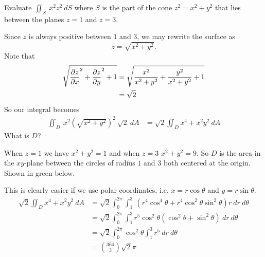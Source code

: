 \documentclass[12pt]{exam}
\begin{document}
\begin{questions}

\question Evaluate \(\iint_S~x^2z^2~dS\) where \(S\) is the part of the cone 
\(z^2=x^2+y^2\) that lies between the planes \(z=1\) and \(z=3\).
\ifprintanswers
        \begin{solution}
            Since \(z\) is always positive between \(1\) and \(3\), we may rewrite the surface as 
            \[
                z=\sqrt{x^2+y^2}.
            \]
            Note that 
            \begin{align*}
                \sqrt{\dfrac{\partial z}{\partial x}^2+\dfrac{\partial z}{\partial y}^2+1} & = \sqrt{\frac{x^2}{x^2+y^2}+\frac{y^2}{x^2+y^2}+1}\\
                    &= \sqrt{2}
            \end{align*}
            So our integral becomes 
            \begin{align*}
                \iint_D~x^2\left(\sqrt{x^2+y^2}\right)^2~\sqrt{2}~dA & = \sqrt{2}\iint_{D}x^4+x^2y^2~dA
            \end{align*}
            What is \(D\)?

            When \(z=1\) we have \(x^2+y^2=1\) and when \(z=3\) \(x^2+y^2=9\). 
            So \(D\) is the area in the \(xy\)-plane between the circles of radius \(1\) and \(3\) both centered at the origin. Shown in green below.
            \begin{center}
            \end{center}
            This is clearly easier if we use polar coordinates, i.e. \(x=r\cos\theta\) and \(y=r\sin\theta\).
            \begin{align*}
            \sqrt{2}\iint_{D}x^4+x^2y^2~dA & = \sqrt{2}\int_0^{2\pi}\int_1^3~\left(r^4\cos^4\theta+r^4\cos^2\theta\sin^2\theta\right)r~dr~d\theta\\
            &= \sqrt{2}\int_0^{2\pi}\int_1^3 r^5\cos^2\theta\left(\cos^2\theta+\sin^2\theta\right)~dr~d\theta\\
            & = \sqrt{2}\int_{0}^{2\pi}\cos^2\theta \int_1^3 r^5~dr~d\theta\\
                & = \left(\frac{364}{3}\right)\sqrt{2}\pi
            \end{align*}
        \end{solution}
    \else
        \vfill
    \fi


\end{questions}
\end{document}
